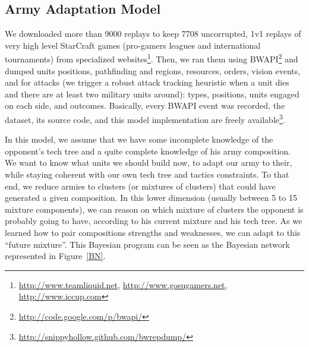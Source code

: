\subsection{Army Adaptation Model}
We downloaded more than 9000 replays to keep 7708 uncorrupted, 1v1 replays of very high level StarCraft games (pro-gamers leagues and international tournaments) from specialized websites\footnote{\url{http://www.teamliquid.net}, \url{http://www.gosugamers.net}, \url{http://www.iccup.com}}. Then, we ran them using BWAPI\footnote{\url{http://code.google.com/p/bwapi/}} and dumped units positions, pathfinding and regions, resources, orders, vision events, and for attacks (we trigger a robust attack tracking heuristic when a unit dies and there are at least two military units around): types, positions, units engaged on each side, and outcomes. Basically, every BWAPI event was recorded, the dataset, its source code, and this model implementation are freely available\footnote{\url{http://snippyhollow.github.com/bwrepdump/}}. 

In this model, we assume that we have some incomplete knowledge of the opponent's tech tree and a quite complete knowledge of his army composition. We want to know what units we should build now, to adapt our army to their, while staying coherent with our own tech tree and tactics constraints. To that end, we reduce armies to clusters (or mixtures of clusters) that could have generated a given composition. In this lower dimension (usually between 5 to 15 mixture components), %
we can reason on which mixture of clusters the opponent is probably going to have, according to his current mixture and his tech tree. As we learned how to pair compositions strengths and weaknesses, we can adapt to this ``future mixture''. This Bayesian program can be seen as the Bayesian network represented in Figure~\ref{BN}. %

